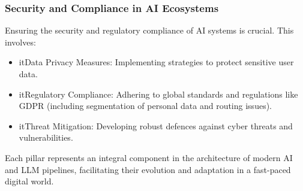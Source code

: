 \subsubsection{Security and Compliance in AI Ecosystems}
Ensuring the security and regulatory compliance of AI systems is crucial. This involves:
\begin{itemize}
    \item it{Data Privacy Measures:} Implementing strategies to protect sensitive user data.
    \item it{Regulatory Compliance:} Adhering to global standards and regulations like GDPR (including segmentation of personal data and routing issues).
    \item it{Threat Mitigation:} Developing robust defences against cyber threats and vulnerabilities.
\end{itemize}

Each pillar represents an integral component in the architecture of modern AI and LLM pipelines, facilitating their evolution and adaptation in a fast-paced digital world.


